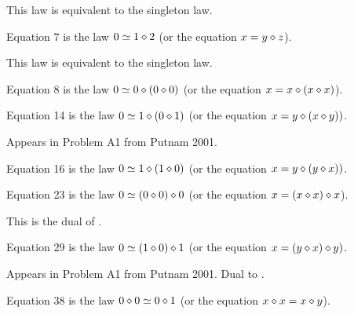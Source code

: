 This law is equivalent to the singleton law.

\begin{definition}[Equation 7]\label{eq7}\leanok{}  Equation 7 is the law $0 \simeq 1 \diamond 2$ (or the equation $x = y \diamond z$).
\end{definition}

This law is equivalent to the singleton law.

\begin{definition}[Equation 8]\label{eq8}\leanok{}  Equation 8 is the law $0 \simeq 0 \diamond (0 \diamond 0)$ (or the equation $x = x \diamond (x \diamond x)$).
\end{definition}

\begin{definition}[Equation 14]\label{eq14}\leanok{}  Equation 14 is the law $0 \simeq  1 \diamond (0 \diamond 1)$ (or the equation $x = y \diamond (x \diamond y))$.
\end{definition}

Appears in Problem A1 from Putnam 2001.

\begin{definition}[Equation 16]\label{eq16}\leanok{}  Equation 16 is the law $0 \simeq  1 \diamond (1 \diamond 0)$ (or the equation $x = y \diamond (y \diamond x))$.
\end{definition}

\begin{definition}[Equation 23]\label{eq23}\leanok{}  Equation 23 is the law $0 \simeq  (0 \diamond 0) \diamond 0$ (or the equation $x = (x \diamond x) \diamond x$).
\end{definition}

This is the dual of .

\begin{definition}[Equation 29]\label{eq29}\leanok{}  Equation 29 is the law $0 \simeq  (1 \diamond 0) \diamond 1$ (or the equation $x = (y \diamond x) \diamond y)$.
\end{definition}

Appears in Problem A1 from Putnam 2001.  Dual to .

\begin{definition}[Equation 38]\label{eq38}\leanok{}  Equation 38 is the law $0 \diamond 0  \simeq  0 \diamond 1$ (or the equation $x \diamond x = x \diamond y$).
\end{definition}

